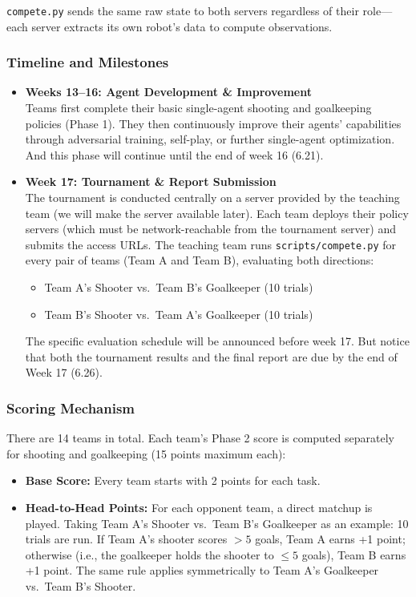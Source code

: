 \documentclass{article}
\begin{document}
\texttt{compete.py} sends the same raw state to both servers regardless of their role---each server extracts its own robot's data to compute observations.

\subsubsection{Timeline and Milestones}
\begin{itemize}
    \item \textbf{Weeks 13--16: Agent Development \& Improvement} \\
    Teams first complete their basic single-agent shooting and goalkeeping policies (Phase 1). They then continuously improve their agents' capabilities through adversarial training, self-play, or further single-agent optimization. And this phase will continue until the end of week 16 (6.21).

    \item \textbf{Week 17: Tournament \& Report Submission} \\
    The tournament is conducted centrally on a server provided by the teaching team (we will make the server available later). Each team deploys their policy servers (which must be network-reachable from the tournament server) and submits the access URLs. The teaching team runs \texttt{scripts/compete.py} for every pair of teams (Team A and Team B), evaluating both directions:
    \begin{itemize}
        \item Team A's Shooter vs.\ Team B's Goalkeeper (10 trials)
        \item Team B's Shooter vs.\ Team A's Goalkeeper (10 trials)
    \end{itemize}
    The specific evaluation schedule will be announced before week 17. But notice that both the tournament results and the final report are due by the end of Week 17 (6.26).
\end{itemize}

\subsubsection{Scoring Mechanism}
There are 14 teams in total. Each team's Phase 2 score is computed separately for shooting and goalkeeping (15 points maximum each):

\begin{itemize}
    \item \textbf{Base Score:} Every team starts with 2 points for each task.
    \item \textbf{Head-to-Head Points:} For each opponent team, a direct matchup is played. Taking Team A's Shooter vs.\ Team B's Goalkeeper as an example: 10 trials are run. If Team A's shooter scores $>5$ goals, Team A earns +1 point; otherwise (i.e., the goalkeeper holds the shooter to $\le 5$ goals), Team B earns +1 point. The same rule applies symmetrically to Team A's Goalkeeper vs.\ Team B's Shooter.
\end{itemize}
\end{document}
